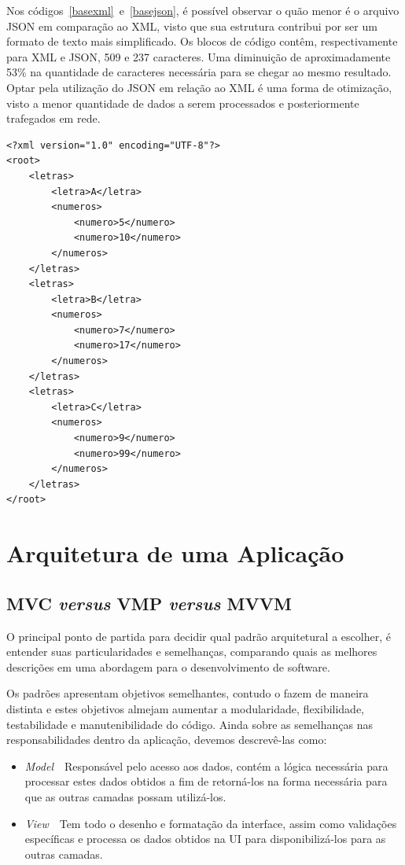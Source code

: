 Nos códigos~\ref{basexml}~e~\ref{basejson}, é possível observar o quão menor é o arquivo JSON em comparação ao XML, visto que sua estrutura contribui por ser um formato de texto mais simplificado. Os blocos de código contêm, respectivamente para XML e JSON, 509 e 237 caracteres. Uma diminuição de aproximadamente 53\% na quantidade de caracteres necessária para se chegar ao mesmo resultado. Optar pela utilização do JSON em relação ao XML é uma forma de otimização, visto a menor quantidade de dados a serem processados e posteriormente trafegados em rede.

\begin{lstlisting}[label=basexml,caption=Exemplo de um arquivo JSON.]
<?xml version="1.0" encoding="UTF-8"?>
<root>
    <letras>
        <letra>A</letra>
        <numeros>
            <numero>5</numero>
            <numero>10</numero>
        </numeros>
    </letras>
    <letras>
        <letra>B</letra>
        <numeros>
            <numero>7</numero>
            <numero>17</numero>
        </numeros>
    </letras>
    <letras>
        <letra>C</letra>
        <numeros>
            <numero>9</numero>
            <numero>99</numero>
        </numeros>
    </letras>
</root>
\end{lstlisting}
%
%
%
%
%
%
%
%
%
\section{Arquitetura de uma Aplicação}
\label{ArquiteturaWeb}

\subsection{MVC \textit{versus} VMP \textit{versus} MVVM}
\label{SubMVCMVVM}

O principal ponto de partida para decidir qual padrão arquitetural a escolher, é entender suas particularidades e semelhanças, comparando quais as melhores descrições em uma abordagem para o desenvolvimento de software.

Os padrões apresentam objetivos semelhantes, contudo o fazem de maneira distinta e estes objetivos almejam aumentar a modularidade, flexibilidade, testabilidade e manutenibilidade do código. Ainda sobre as semelhanças nas responsabilidades dentro da aplicação, devemos descrevê-las como:
\begin{itemize}
    \item \textit{Model}~\textemdash~Responsável pelo acesso aos dados, contém a lógica necessária para processar estes dados obtidos a fim de retorná-los na forma necessária para que as outras camadas possam utilizá-los.
    \item \textit{View}~\textemdash~Tem todo o desenho e formatação da interface, assim como validações específicas e processa os dados obtidos na UI para disponibilizá-los para as outras camadas.
\end{itemize}


